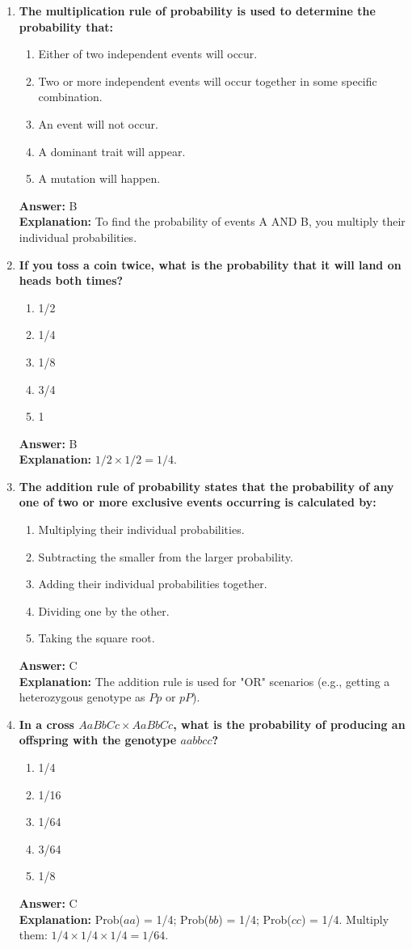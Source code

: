 \documentclass[11pt, a4paper]{article}
\begin{document}
\begin{enumerate}[leftmargin=*, label=\arabic*.]
\item \textbf{The multiplication rule of probability is used to determine the probability that:}
\begin{enumerate}[label=\Alph*.]
\item Either of two independent events will occur.
\item Two or more independent events will occur together in some specific combination.
\item An event will not occur.
\item A dominant trait will appear.
\item A mutation will happen.
\end{enumerate}
\textbf{Answer:} B \\
\textbf{Explanation:} To find the probability of events A AND B, you multiply their individual probabilities.

\item \textbf{If you toss a coin twice, what is the probability that it will land on heads both times?}
\begin{enumerate}[label=\Alph*.]
\item 1/2
\item 1/4
\item 1/8
\item 3/4
\item 1
\end{enumerate}
\textbf{Answer:} B \\
\textbf{Explanation:} $1/2 \times 1/2 = 1/4$.

\item \textbf{The addition rule of probability states that the probability of any one of two or more exclusive events occurring is calculated by:}
\begin{enumerate}[label=\Alph*.]
\item Multiplying their individual probabilities.
\item Subtracting the smaller from the larger probability.
\item Adding their individual probabilities together.
\item Dividing one by the other.
\item Taking the square root.
\end{enumerate}
\textbf{Answer:} C \\
\textbf{Explanation:} The addition rule is used for "OR" scenarios (e.g., getting a heterozygous genotype as $Pp$ or $pP$).

\item \textbf{In a cross $AaBbCc \times AaBbCc$, what is the probability of producing an offspring with the genotype $aabbcc$?}
\begin{enumerate}[label=\Alph*.]
\item 1/4
\item 1/16
\item 1/64
\item 3/64
\item 1/8
\end{enumerate}
\textbf{Answer:} C \\
\textbf{Explanation:} Prob($aa$) = 1/4; Prob($bb$) = 1/4; Prob($cc$) = 1/4. Multiply them: $1/4 \times 1/4 \times 1/4 = 1/64$.


\end{enumerate}
\end{document}
